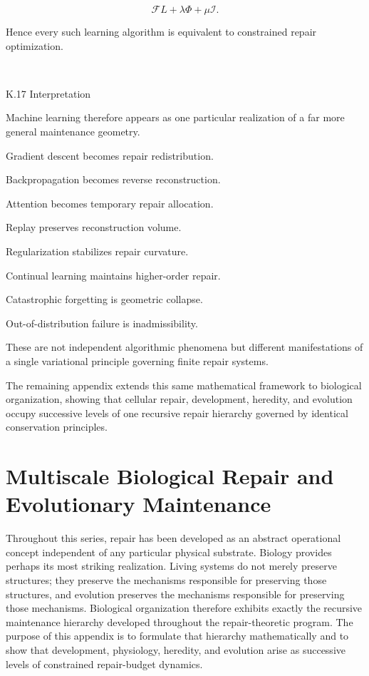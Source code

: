 \documentclass[12pt,oneside]{article}
\theoremstyle{plain}
\theoremstyle{definition}
\theoremstyle{remark}
\begin{document}
\[
\mathcal F
L
+
\lambda\Phi
+
\mu\mathcal I.
\]

Hence every such learning algorithm is equivalent to constrained repair optimization.

\square


K.17 Interpretation

Machine learning therefore appears as one particular realization of a far more general maintenance geometry.

Gradient descent becomes repair redistribution.

Backpropagation becomes reverse reconstruction.

Attention becomes temporary repair allocation.

Replay preserves reconstruction volume.

Regularization stabilizes repair curvature.

Continual learning maintains higher-order repair.

Catastrophic forgetting is geometric collapse.

Out-of-distribution failure is inadmissibility.

These are not independent algorithmic phenomena but different manifestations of a single variational principle governing finite repair systems.

The remaining appendix extends this same mathematical framework to biological organization, showing that cellular repair, development, heredity, and evolution occupy successive levels of one recursive repair hierarchy governed by identical conservation principles.

\section{Multiscale Biological Repair and Evolutionary Maintenance}

Throughout this series, repair has been developed as an abstract operational concept independent of any particular physical substrate. Biology provides perhaps its most striking realization. Living systems do not merely preserve structures; they preserve the mechanisms responsible for preserving those structures, and evolution preserves the mechanisms responsible for preserving those mechanisms. Biological organization therefore exhibits exactly the recursive maintenance hierarchy developed throughout the repair-theoretic program. The purpose of this appendix is to formulate that hierarchy mathematically and to show that development, physiology, heredity, and evolution arise as successive levels of constrained repair-budget dynamics.
\end{document}

